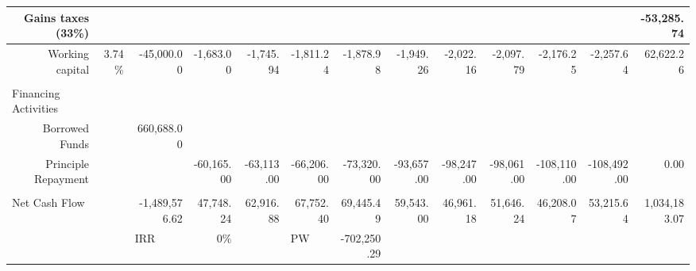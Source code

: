 \documentclass[12pt]{article}
\begin{document}
\begin{landscape}
\begin{table}[htbp]
\begin{tabular}{|r|r|l|r|r|l|r|r|r|r|r|r|r|}
    \hline
                  Gains taxes (33\%) &       &       &       &       &       &       &       &       &       &       &       & \textcolor[rgb]{ 1,  0,  0}{-53,285.74} \\
    \hline
                  Working capital & 3.74\% & \multicolumn{1}{r|}{\textcolor[rgb]{ 1,  0,  0}{-45,000.00}} & \textcolor[rgb]{ 1,  0,  0}{-1,683.00} & \textcolor[rgb]{ 1,  0,  0}{-1,745.94} & \multicolumn{1}{r|}{\textcolor[rgb]{ 1,  0,  0}{-1,811.24}} & \textcolor[rgb]{ 1,  0,  0}{-1,878.98} & \textcolor[rgb]{ 1,  0,  0}{-1,949.26} & \textcolor[rgb]{ 1,  0,  0}{-2,022.16} & \textcolor[rgb]{ 1,  0,  0}{-2,097.79} & \textcolor[rgb]{ 1,  0,  0}{-2,176.25} & \textcolor[rgb]{ 1,  0,  0}{-2,257.64} & 62,622.26 \\
    \hline
          &       &       &       &       &       &       &       &       &       &       &       &  \\
    \hline
    \multicolumn{1}{|l|}{Financing Activities} &       &       &       &       &       &       &       &       &       &       &       &  \\
    \hline
                   Borrowed Funds &       & \multicolumn{1}{r|}{660,688.00} &       &       &       &       &       &       &       &       &       &  \\
    \hline
                   Principle Repayment &       &       & \textcolor[rgb]{ 1,  0,  0}{-60,165.00} & \textcolor[rgb]{ 1,  0,  0}{-63,113.00} & \multicolumn{1}{r|}{\textcolor[rgb]{ 1,  0,  0}{-66,206.00}} & \textcolor[rgb]{ 1,  0,  0}{-73,320.00} & \textcolor[rgb]{ 1,  0,  0}{-93,657.00} & \textcolor[rgb]{ 1,  0,  0}{-98,247.00} & \textcolor[rgb]{ 1,  0,  0}{-98,061.00} & \textcolor[rgb]{ 1,  0,  0}{-108,110.00} & \textcolor[rgb]{ 1,  0,  0}{-108,492.00} & 0.00 \\
    \hline
          &       &       &       &       &       &       &       &       &       &       &       &  \\
    \hline
    \multicolumn{1}{|l|}{Net Cash Flow} &       & \multicolumn{1}{r|}{\textcolor[rgb]{ 1,  0,  0}{-1,489,576.62}} & 47,748.24 & 62,916.88 & \multicolumn{1}{r|}{67,752.40} & 69,445.49 & 59,543.00 & 46,961.18 & 51,646.24 & 46,208.07 & 53,215.64 & 1,034,183.07 \\
    \hline
          &       & IRR   & 0\%   &       & PW    & \textcolor[rgb]{ 1,  0,  0}{-702,250.29} &       &       &       &       &       &  \\
    \bottomrule
    \end{tabular}%
  \label{tab:addlabel}%
\end{table}%




\end{landscape}
\end{document}
